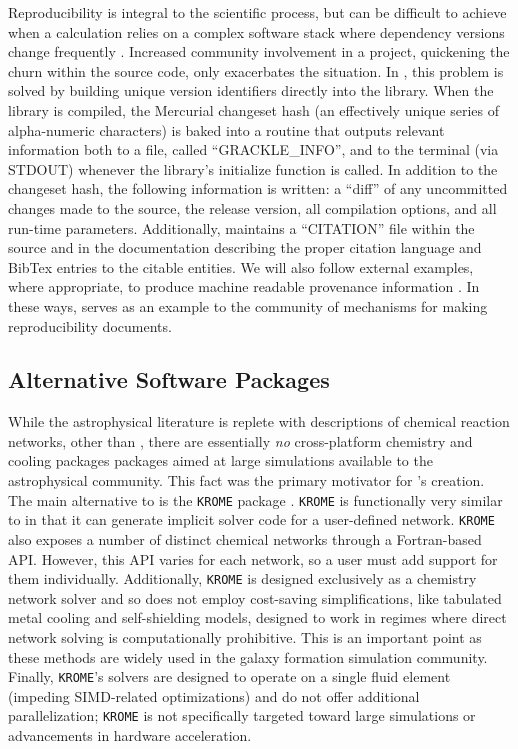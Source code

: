 Reproducibility is integral to the scientific process, but can be
difficult to achieve when a calculation relies on a complex software
stack where dependency versions change frequently
\citep{2014arXiv1412.5557J, 2016arXiv161009958L}.  Increased
community involvement in a project, quickening the churn within the
source code, only exacerbates the situation.  In \grackle{}, this
problem is solved by building unique version identifiers directly
into the library.  When the library is compiled, the Mercurial
changeset hash (an effectively unique series of alpha-numeric
characters) is baked into a routine that outputs relevant information
both to a file, called ``GRACKLE\_INFO'', and to the terminal (via
STDOUT) whenever the library's initialize function is called.  In
addition to the changeset hash, the following information is written:
a ``diff'' of any uncommitted changes made to the source, the release
version, all compilation options, and all run-time parameters.
Additionally, \grackle{} maintains a ``CITATION'' file within the
source and in the documentation describing the proper citation
language and BibTex entries to the citable entities.  We will also
follow external examples, where appropriate, to produce machine
readable provenance information \citep[e.g.,][]{force11,
  Fenner097196}.  In these ways, \grackle{} serves as an example to
the community of mechanisms for making reproducibility documents.

\subsection{Alternative Software Packages}

While the astrophysical literature is replete with descriptions of chemical
reaction networks, other than \grackle{}, there are essentially \textit{no}
cross-platform chemistry and cooling packages packages aimed at large
simulations available to the astrophysical community.  This fact was the primary
motivator for \grackle{}'s creation.  The main alternative to \grackle{} is the 
\texttt{KROME} package
\citep{2014MNRAS.439.2386G}.  \texttt{KROME} is functionally very
similar to \dengo{} in that it can generate implicit solver code for a
user-defined network.  \texttt{KROME} also exposes a number of
distinct chemical networks through a Fortran-based API.  However, this
API varies for each network, so a user must add support for them
individually.  Additionally, \texttt{KROME} is designed exclusively as
a chemistry network solver and so does not employ cost-saving
simplifications, like tabulated metal cooling and self-shielding
models, designed to work in regimes where direct network solving is
computationally prohibitive.  This is an important point as these
methods are widely used in the galaxy formation simulation community.
Finally, \texttt{KROME}'s solvers are designed to operate on a single
fluid element (impeding SIMD-related optimizations) and do not offer additional
parallelization; \texttt{KROME} is not specifically targeted toward large
simulations or advancements in hardware acceleration.

